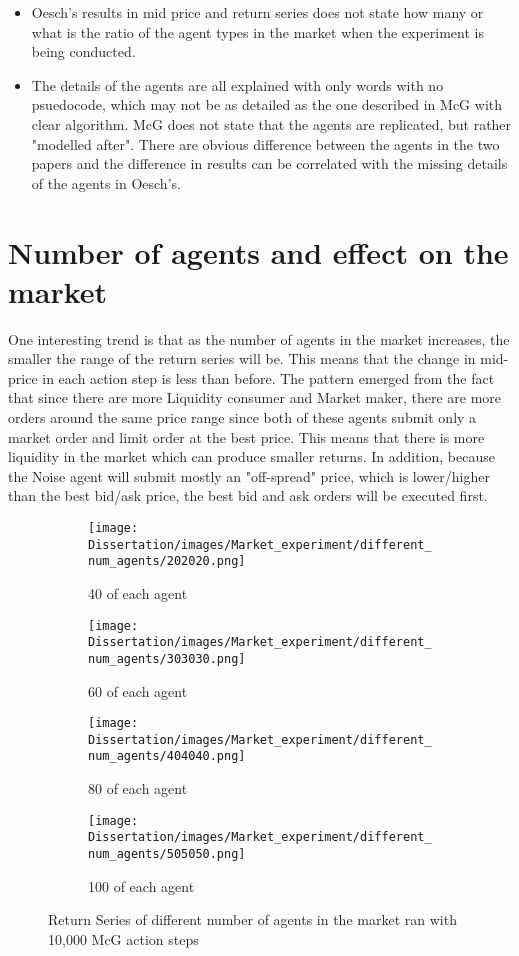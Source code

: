 \begin{itemize}
  \item Oesch's results in mid price and return series does not state how many or what is the ratio of the agent types in the market when the experiment is being conducted.
  \item The details of the agents are all explained with only words with no psuedocode, which may not be as detailed as the one described in McG with clear algorithm. McG does not state that the agents are replicated, but rather "modelled after". There are obvious difference between the agents in the two papers and the difference in results can be correlated with the missing details of the agents in Oesch's. 
\end{itemize}

\section{Number of agents and effect on the market}

One interesting trend is that as the number of agents in the market increases, the smaller the range of the return series will be. This means that the change in mid-price in each action step is less than before. The pattern emerged from the fact that since there are more Liquidity consumer and Market maker, there are more orders around the same price range since both of these agents submit only a market order and limit order at the best price. This means that there is more liquidity in the market which can produce smaller returns. In addition, because the Noise agent will submit mostly an "off-spread" price, which is lower/higher than the best bid/ask price, the best bid and ask orders will be executed first. 

\begin{figure}[h]
  \begin{subfigure}[b]{0.5\textwidth}
    \texttt{[image: Dissertation/images/Market\_experiment/different\_num\_agents/202020.png]}
    \caption{40 of each agent}
    \label{fig:1}
  \end{subfigure}
  \begin{subfigure}[b]{0.5\textwidth}
    \texttt{[image: Dissertation/images/Market\_experiment/different\_num\_agents/303030.png]}
    \caption{60 of each agent}
    \label{fig:2}
  \end{subfigure}

  \begin{subfigure}[b]{0.5\textwidth}
    \texttt{[image: Dissertation/images/Market\_experiment/different\_num\_agents/404040.png]}
    \caption{80 of each agent}
    \label{fig:1}
  \end{subfigure}
  \begin{subfigure}[b]{0.5\textwidth}
    \texttt{[image: Dissertation/images/Market\_experiment/different\_num\_agents/505050.png]}
    \caption{100 of each agent}
    \label{fig:2}
  \end{subfigure}
\caption{Return Series of different number of agents in the market ran with 10,000 McG action steps} 
\end{figure}
\FloatBarrier

